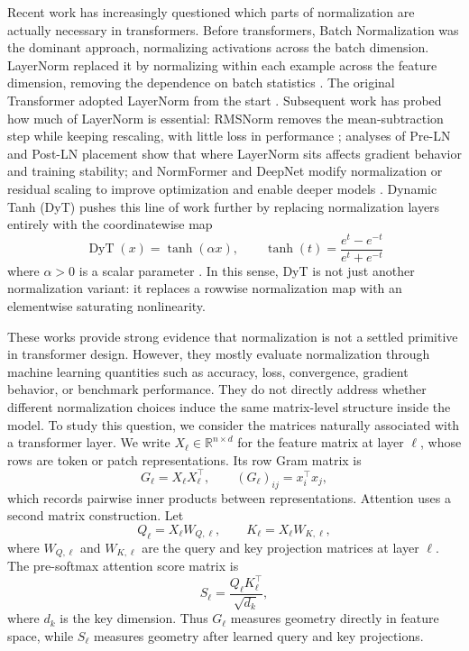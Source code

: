 \documentclass[11pt]{article}
\newcommand{\DyT}{\operatorname{DyT}}
\begin{document}
Recent work has increasingly questioned which parts of normalization are actually necessary in transformers. Before transformers, Batch Normalization was the dominant approach, normalizing activations across the batch dimension. LayerNorm replaced it by normalizing within each example across the feature dimension, removing the dependence on batch statistics \cite{ba2016layer}. The original Transformer adopted LayerNorm from the start \cite{vaswani2017attention}. Subsequent work has probed how much of LayerNorm is essential: RMSNorm removes the mean-subtraction step while keeping rescaling, with little loss in performance \cite{zhang2019rmsnorm}; analyses of Pre-LN and Post-LN placement show that where LayerNorm sits affects gradient behavior and training stability; and NormFormer and DeepNet modify normalization or residual scaling to improve optimization and enable deeper models \cite{xiong2020layernorm,shleifer2021normformer,wang2022deepnet}. Dynamic Tanh (DyT) pushes this line of work further by replacing normalization layers entirely with the coordinatewise map
\begin{equation}
    \DyT(x)=\tanh(\alpha x),
    \qquad
    \tanh(t)=\frac{e^t-e^{-t}}{e^t+e^{-t}}
\label{eq:dyt}
\end{equation}
where \(\alpha>0\) is a scalar parameter \cite{zhu2025transformers}. In this sense, DyT is not just another normalization variant: it replaces a rowwise normalization map with an elementwise saturating nonlinearity.

These works provide strong evidence that normalization is not a settled primitive in transformer design. However, they mostly evaluate normalization through machine learning quantities such as accuracy, loss, convergence, gradient behavior, or benchmark performance. They do not directly address whether different normalization choices induce the same matrix-level structure inside the model. To study this question, we consider the matrices naturally associated with a transformer layer. We write \(X_\ell\in\mathbb R^{n\times d}\) for the feature matrix at layer \(\ell\), whose rows are token or patch representations. Its row Gram matrix is
\begin{equation}
    G_\ell=X_\ell X_\ell^\top,
    \qquad
    (G_\ell)_{ij}=x_i^\top x_j,
\label{eq:intro-gram}
\end{equation}
which records pairwise inner products between representations. Attention uses a second matrix construction. Let
\begin{equation}
    Q_\ell=X_\ell W_{Q,\ell},
    \qquad
    K_\ell=X_\ell W_{K,\ell},
\label{eq:intro-qk}
\end{equation}
where \(W_{Q,\ell}\) and \(W_{K,\ell}\) are the query and key projection matrices at layer \(\ell\). The pre-softmax attention score matrix is
\begin{equation}
    S_\ell=\frac{Q_\ell K_\ell^\top}{\sqrt{d_k}},
\label{eq:intro-attention-score}
\end{equation}
where \(d_k\) is the key dimension. Thus \(G_\ell\) measures geometry directly in feature space, while \(S_\ell\) measures geometry after learned query and key projections.
\end{document}
